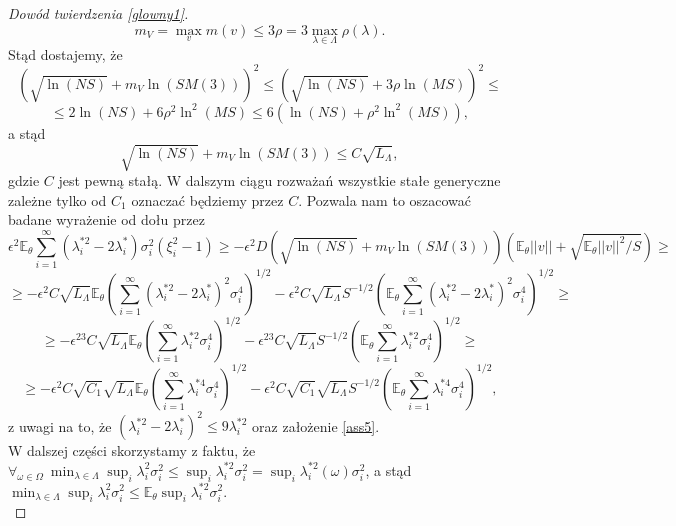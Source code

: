 \documentclass{mwart}
\begin{document}
\begin{proof}[Dowód twierdzenia \ref{glowny1}]
\begin{displaymath}
m_V=\max_{v}m(v)\leq 3\rho=3\max_{\lambda\in \Lambda}\rho(\lambda).
\end{displaymath}
Stąd dostajemy, że 
\begin{displaymath}
\left(\sqrt{\ln (NS)}+m_V\ln (SM(3))\right)^2\leq \left(\sqrt{\ln (NS)}+3\rho\ln (MS)\right)^2\leq 
\end{displaymath}
\begin{displaymath}
\leq 2\ln (NS)+6\rho^2\ln^2 (MS)\leq 6(\ln (NS)+\rho^2\ln^2 (MS)),
\end{displaymath}
a stąd
\begin{displaymath}
\sqrt{\ln (NS)}+m_V\ln (SM(3))\leq C\sqrt{L_{\Lambda}},
\end{displaymath}
gdzie $C$ jest pewną stałą. W dalszym ciągu rozważań wszystkie stałe generyczne zależne tylko od $C_1$ oznaczać będziemy przez $C$. Pozwala nam to oszacować badane wyrażenie od dołu przez
\begin{displaymath}
\epsilon^2\mathbb{E}_{\theta}\sum_{i=1}^{\infty}(\lambda_i^{*2}-2\lambda_i^*)\sigma_i^2(\xi_i^2-1)\geq -\epsilon^2D\left(\sqrt{\ln (NS)}+m_V\ln (SM(3))\right)\left(\mathbb{E}_{\theta}||v||+\sqrt{\mathbb{E}_{\theta}||v||^2/S}\right)\geq
\end{displaymath}
\begin{displaymath}
\geq -\epsilon^2C\sqrt{L_{\Lambda}}\mathbb{E}_{\theta}\left(\sum_{i=1}^{\infty}(\lambda_i^{*2}-2\lambda_i^*)^2\sigma_i^4\right)^{1/2}-\epsilon^2C\sqrt{L_{\Lambda}}S^{-1/2}\left(\mathbb{E}_{\theta}\sum_{i=1}^{\infty}(\lambda_i^{*2}-2\lambda_i^*)^2\sigma_i^4\right)^{1/2}\geq
\end{displaymath}
\begin{displaymath}
\geq -\epsilon^23C\sqrt{L_{\Lambda}}\mathbb{E}_{\theta}\left(\sum_{i=1}^{\infty}\lambda_i^{*2}\sigma_i^4\right)^{1/2}-\epsilon^23C\sqrt{L_{\Lambda}}S^{-1/2}\left(\mathbb{E}_{\theta}\sum_{i=1}^{\infty}\lambda_i^{*2}\sigma_i^4\right)^{1/2}\geq
\end{displaymath}
\begin{displaymath}
\geq -\epsilon^2C\sqrt{C_1}\sqrt{L_{\Lambda}}\mathbb{E}_{\theta}\left(\sum_{i=1}^{\infty}\lambda_i^{*4}\sigma_i^4\right)^{1/2}-\epsilon^2C\sqrt{C_1}\sqrt{L_{\Lambda}}S^{-1/2}\left(\mathbb{E}_{\theta}\sum_{i=1}^{\infty}\lambda_i^{*4}\sigma_i^4\right)^{1/2},
\end{displaymath}
z uwagi na to, że $(\lambda_i^{*2}-2\lambda_i^*)^2\leq 9\lambda_i^{*2}$ oraz założenie \ref{ass5}.\\
W dalszej części skorzystamy z faktu, że $\forall_{\omega\in \Omega}\ \min_{\lambda\in \Lambda}\sup_i \lambda_i^2\sigma_i^2\leq \sup_i\lambda_i^{*2}\sigma_i^2=\sup_i\lambda_i^{*2}(\omega)\sigma_i^2$, a stąd $\min_{\lambda\in \Lambda}\sup_i \lambda_i^2\sigma_i^2\leq \mathbb{E}_{\theta}\sup_i\lambda_i^{*2}\sigma_i^2$.\\

\end{proof}
\end{document}
